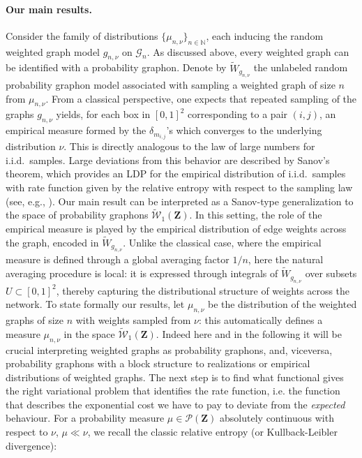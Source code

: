 \documentclass[12pt,twoside,a4paper]{article}
\newcommand{\Space}{\mathbf{Z}}
\begin{document}
\paragraph{Our main results.} Consider the family of distributions $\{\mu_{n,\nu}\}_{n \in \mathbb{N}}$, each inducing the random weighted graph model $g_{n,\nu}$ on $\mathcal{G}_n$. As discussed above, every weighted graph can be identified with a probability graphon. Denote by $\widetilde{W}_{g_{n,\nu}}$ the unlabeled random probability graphon model associated with sampling a weighted graph of size $n$ from $\mu_{n,\nu}$. 
From a classical perspective, one expects that repeated sampling of the graphs $g_{n,\nu}$ yields, for each box in $[0,1]^2$ corresponding to a pair $(i,j)$, an empirical measure formed by the $\delta_{m_{i,j}}$’s which converges to the underlying distribution $\nu$. This is directly analogous to the law of large numbers for i.i.d.\ samples. Large deviations from this behavior are described by Sanov’s theorem, which provides an LDP for the empirical distribution of i.i.d.\ samples with rate function given by the relative entropy with respect to the sampling law (see, e.g., \cite[Theorem~6.2.10]{dembo2009large}).  
Our main result can be interpreted as a Sanov-type generalization to the space of probability graphons $\widetilde{\mathcal{W}}_1(\Space)$. In this setting, the role of the empirical measure is played by the empirical distribution of edge weights across the graph, encoded in $\widetilde{W}_{g_{n,\nu}}$. Unlike the classical case, where the empirical measure is defined through a global averaging factor $1/n$, here the natural averaging procedure is local: it is expressed through integrals of $\widetilde{W}_{g_{n,\nu}}$ over subsets $U \subset [0,1]^2$, thereby capturing the distributional structure of weights across the network.
To state formally our results, let $\mu_{n,\nu}$ be the distribution of the weighted graphs of size $n$ with weights sampled from $\nu$: this automatically defines a measure  $\mu_{n,\nu}$ in the space $\widetilde{\mathcal{W}}_1(\Space)$. Indeed here and in the following it will be crucial interpreting weighted graphs as probability graphons, and, viceversa, probability graphons with a block structure to realizations or empirical distributions of weighted graphs. The next step is to find what functional gives the right variational problem that identifies the rate function, i.e. the function that describes the exponential cost we have to pay to deviate from the \emph{expected} behaviour. For a probability measure $\mu\in\mathcal{P}(\Space)$ absolutely continuous with respect to $\nu$, $\mu\ll\nu$, we recall the classic relative entropy (or Kullback-Leibler divergence):
\end{document}
